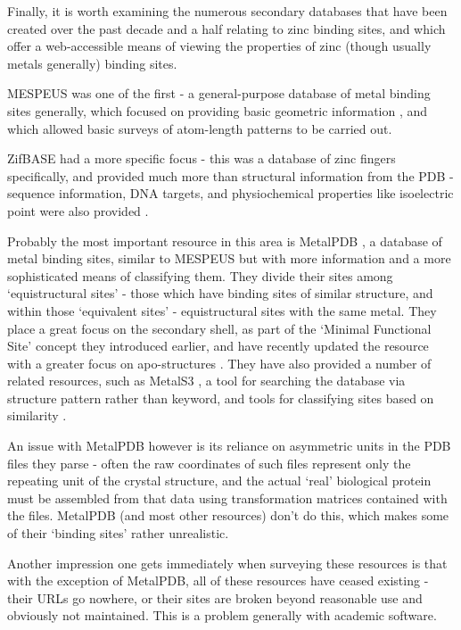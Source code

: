 Finally, it is worth examining the numerous secondary databases that have been created over the past decade and a half relating to zinc binding sites, and which offer a web-accessible means of viewing the properties of zinc (though usually metals generally) binding sites.

MESPEUS was one of the first - a general-purpose database of metal binding sites generally, which focused on providing basic geometric information \cite{hsin2008mespeus}, and which allowed basic surveys of atom-length patterns to be carried out.

ZifBASE had a more specific focus - this was a database of zinc fingers specifically, and provided much more than structural information from the PDB - sequence information, DNA targets, and physiochemical properties like isoelectric point were also provided \cite{jayakanthan2009zifbase}.

Probably the most important resource in this area is MetalPDB \cite{andreini2012metalpdb}, a database of metal binding sites, similar to MESPEUS but with more information and a more sophisticated means of classifying them. They divide their sites among `equistructural sites' - those which have binding sites of similar structure, and within those `equivalent sites' - equistructural sites with the same metal. They place a great focus on the secondary shell, as part of the `Minimal Functional Site' concept they introduced earlier, and have recently updated the resource with a greater focus on apo-structures \cite{putignano2017metalpdb}. They have also provided a number of related resources, such as MetalS3 \cite{valasatava2014metals}, a tool for searching the database via structure pattern rather than keyword, and tools for classifying sites based on similarity \cite{sobolev2013web}.

An issue with MetalPDB however is its reliance on asymmetric units in the PDB files they parse - often the raw coordinates of such files represent only the repeating unit of the crystal structure, and the actual `real' biological protein must be assembled from that data using transformation matrices contained with the files. MetalPDB (and most other resources) don't do this, which makes some of their `binding sites' rather unrealistic.

Another impression one gets immediately when surveying these resources is that with the exception of MetalPDB, all of these resources have ceased existing - their URLs go nowhere, or their sites are broken beyond reasonable use and obviously not maintained. This is a problem generally with academic software.

